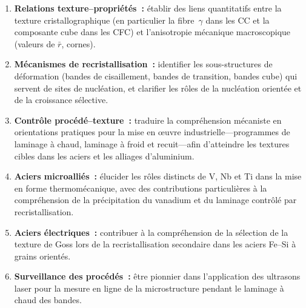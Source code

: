 \documentclass[11pt,a4paper]{article}
\begin{document}
\begin{enumerate}
  \item \textbf{Relations texture--propri\'et\'es~:} \'etablir des liens
    quantitatifs entre la texture cristallographique (en particulier la
    fibre~$\gamma$ dans les CC et la composante cube dans les CFC) et
    l'anisotropie m\'ecanique macroscopique (valeurs de $\bar{r}$,
    cornes).

  \item \textbf{M\'ecanismes de recristallisation~:} identifier les
    sous-structures de d\'eformation (bandes de cisaillement, bandes de
    transition, bandes cube) qui servent de sites de nucl\'eation, et
    clarifier les r\^oles de la nucl\'eation orient\'ee et de la
    croissance s\'elective.

  \item \textbf{Contr\^ole proc\'ed\'e--texture~:} traduire la
    compr\'ehension m\'ecaniste en orientations pratiques pour la mise en
    \oe uvre industrielle---programmes de laminage \`a chaud, laminage
    \`a froid et recuit---afin d'atteindre les textures cibles dans les
    aciers et les alliages d'aluminium.

  \item \textbf{Aciers microalli\'es~:} \'elucider les r\^oles distincts
    de V, Nb et Ti dans la mise en forme thermom\'ecanique, avec des
    contributions particuli\`eres \`a la compr\'ehension de la
    pr\'ecipitation du vanadium et du laminage contr\^ol\'e par
    recristallisation.

  \item \textbf{Aciers \'electriques~:} contribuer \`a la compr\'ehension
    de la s\'election de la texture de Goss lors de la recristallisation
    secondaire dans les aciers Fe--Si \`a grains orient\'es.

  \item \textbf{Surveillance des proc\'ed\'es~:} \^etre pionnier dans
    l'application des ultrasons laser pour la mesure en ligne de la
    microstructure pendant le laminage \`a chaud des bandes.
\end{enumerate}
\end{document}
